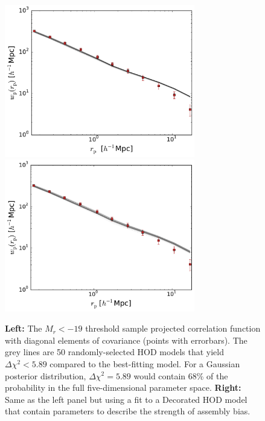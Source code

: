 \documentclass[usenatbib,usegraphicx,letterpaper]{mn2e}
\begin{document}
\begin{figure}
\begin{center}
\includegraphics[width=8.3cm]{Mr19samples.pdf}
\includegraphics[width=8.3cm]{Mr19ABsamples.pdf}
\caption{
{\bf Left:} The $M_r<-19$ threshold sample projected correlation function with diagonal elements of
covariance (points with errorbars). The grey lines are 50 randomly-selected HOD models that yield
$\Delta \chi^2 < 5.89$ compared to the best-fitting model. For a Gaussian posterior distribution,
$\Delta \chi^2 = 5.89$ would contain 68\% of the probability in the full five-dimensional parameter
space. {\bf Right:} Same as the left panel but using a
fit to a Decorated HOD model that contain parameters to describe the strength of assembly bias.
}
\label{fig:Mr19samples}
\end{center}
\end{figure}
\end{document}
